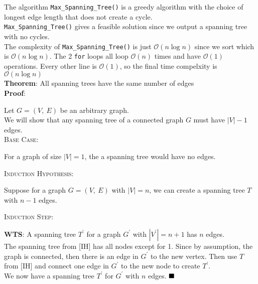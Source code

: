 \documentclass[12pt]{article}
\begin{document}
The algorithm \texttt{Max\_Spanning\_Tree()} is a greedy algorithm with the choice of longest edge length that does not create a cycle.\\

\texttt{Max\_Spanning\_Tree()} gives a feasible solution since we output a spanning tree with no cycles.\\

The complexity of \texttt{Max\_Spanning\_Tree()} is just $\mathcal{O}(n \log n)$ since we sort which is $\mathcal{O}(n \log n)$.
The 2 \texttt{for} loops all loop $\mathcal{O}(n)$ times and have $\mathcal{O}(1)$ operations.
Every other line is $\mathcal{O}(1)$, so the final time compelxity is $\mathcal{O}(n \log n)$\\

\newpage
\textbf{Theorem}: All spanning trees have the same number of edges\\
\textbf{Proof}:
\begin{adjustwidth}{10mm}{}
	Let $G = (V,\ E)$ be an arbitrary graph.\\

	We will show that any spanning tree of a connected graph $G$ must have $|V|-1$ edges.\\

	\textsc{Base Case}:
	\begin{adjustwidth}{10mm}{}
		For a graph of size $|V| = 1$, the a spanning tree would have no edges.
	\end{adjustwidth}
	\textsc{Induction Hypothesis}:
	\begin{adjustwidth}{10mm}{}
		Suppose for a graph $G = (V,\ E)$ with $|V| = n$, we can create a spanning tree $T$ with $n-1$ edges.
	\end{adjustwidth}
	\textsc{Induction Step}:
	\begin{adjustwidth}{10mm}{}
		\textbf{WTS}: A spanning tree $T^\prime$ for a graph $G^\prime$ with $|V^\prime| = n+1$ has $n$ edges.\\

		The spanning tree from [IH] has all nodes except for 1. Since by assumption, the graph is connected,
		then there is an edge in $G^\prime$ to the new vertex. Then use $T$ from [IH] and connect one edge in $G^\prime$ to the new node to create $T^\prime$.\\
		We now have a spanning tree $T^\prime$ for $G^\prime$ with $n$ edges. $\hspace*{\fill}\blacksquare$
	\end{adjustwidth}
\end{adjustwidth}~\\[-5mm]
\end{document}
